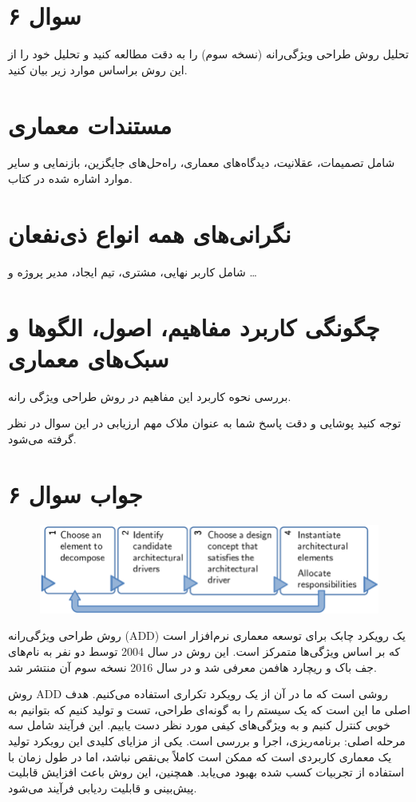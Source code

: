 \section*{سوال ۶}

تحلیل روش طراحی ویژگی‌رانه (نسخه سوم) را به دقت مطالعه کنید و تحلیل خود را از این روش براساس موارد زیر بیان کنید.

\section*{مستندات معماری}
شامل تصمیمات، عقلانیت، دیدگاه‌های معماری، راه‌حل‌های جایگزین، بازنمایی و سایر موارد اشاره شده در کتاب.

\section*{نگرانی‌های همه انواع ذی‌نفعان}
شامل کاربر نهایی، مشتری، تیم ایجاد، مدیر پروژه و …

\section*{چگونگی کاربرد مفاهیم، اصول، الگوها و سبک‌های معماری}
بررسی نحوه کاربرد این مفاهیم در روش طراحی ویژگی رانه.

توجه کنید پوشایی و دقت پاسخ شما به عنوان ملاک مهم ارزیابی در این سوال در نظر گرفته می‌شود.

\section*{جواب سوال ۶}

\begin{figure}[H]
	\centering
	\includegraphics{pic10.png}
	\label{fig:label4}
\end{figure}

روش طراحی ویژگی‌رانه (ADD) یک رویکرد چابک برای توسعه معماری نرم‌افزار است که بر اساس ویژگی‌ها متمرکز است. این روش در سال 2004 توسط دو نفر به نام‌های جف باک و ریچارد هافمن معرفی شد و در سال 2016 نسخه سوم آن منتشر شد.

روش ADD روشی است که ما در آن از یک رویکرد تکراری استفاده می‌کنیم. هدف اصلی ما این است که یک سیستم را به گونه‌ای طراحی، تست و تولید کنیم که بتوانیم به خوبی کنترل کنیم و به ویژگی‌های کیفی مورد نظر دست یابیم. این فرآیند شامل سه مرحله اصلی: برنامه‌ریزی، اجرا و بررسی است. یکی از مزایای کلیدی این رویکرد تولید یک معماری کاربردی است که ممکن است کاملاً بی‌نقص نباشد، اما در طول زمان با استفاده از تجربیات کسب شده بهبود می‌یابد. همچنین، این روش باعث افزایش قابلیت پیش‌بینی و قابلیت ردیابی فرآیند می‌شود.

